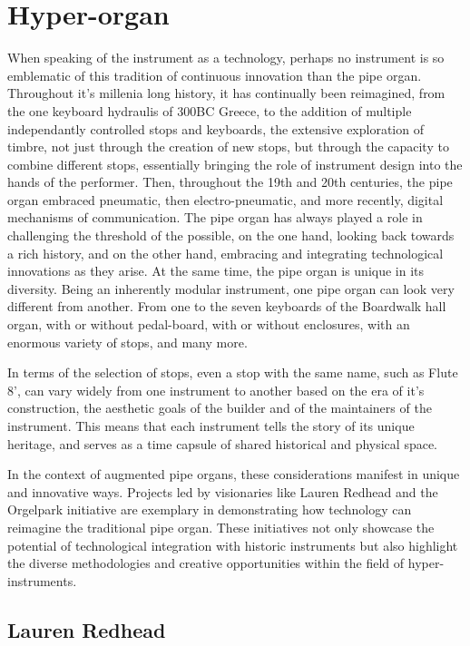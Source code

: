 \documentclass[12pt,twoside,maitrise]{dms_ks}
\theoremstyle{definition}
\begin{document}
{\section{Hyper-organ}

When speaking of the instrument as a technology, perhaps no instrument is so emblematic of this tradition of continuous innovation than the pipe organ. 
Throughout it's millenia long history, it has continually been reimagined, from the one keyboard hydraulis of 300BC Greece, to the addition of multiple independantly controlled stops and keyboards, the extensive exploration of timbre, not just through the creation of new stops, but through the capacity to combine different stops, essentially bringing the role of instrument design into the hands of the performer. 
Then, throughout the 19th and 20th centuries, the pipe organ embraced pneumatic, then electro-pneumatic, and more recently, digital mechanisms of communication. 
The pipe organ has always played a role in challenging the threshold of the possible, on the one hand, looking back towards a rich history, and on the other hand, embracing and integrating technological innovations as they arise. 
At the same time, the pipe organ is unique in its diversity. 
Being an inherently modular instrument, one pipe organ can look very different from another. 
From one to the seven keyboards of the Boardwalk hall organ, with or without pedal-board, with or without enclosures, with an enormous variety of stops, and many more. 

In terms of the selection of stops, even a stop with the same name, such as Flute 8', can vary widely from one instrument to another based on the era of it's construction, the aesthetic goals of the builder and of the maintainers of the instrument. 
This means that each instrument tells the story of its unique heritage, and serves as a time capsule of shared historical and physical space.

In the context of augmented pipe organs, these considerations manifest in unique and innovative ways.
Projects led by visionaries like Lauren Redhead and the Orgelpark initiative are exemplary in demonstrating how technology can reimagine the traditional pipe organ.
These initiatives not only showcase the potential of technological integration with historic instruments but also highlight the diverse methodologies and creative opportunities within the field of hyper-instruments.

\subsection{Lauren Redhead}

}
\end{document}
